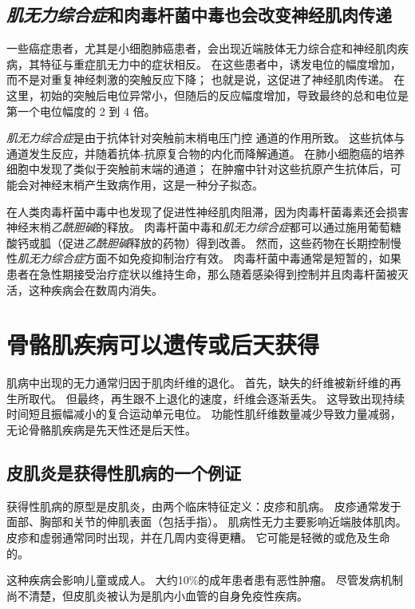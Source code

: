 \subsection{\textit{肌无力综合症}和肉毒杆菌中毒也会改变神经肌肉传递}

一些癌症患者，尤其是小细胞肺癌患者，会出现近端肢体无力综合症和神经肌肉疾病，其特征与重症肌无力中的症状相反。
在这些患者中，诱发电位的幅度增加，而不是对重复神经刺激的突触反应下降；
也就是说，这促进了神经肌肉传递。
在这里，初始的突触后电位异常小，但随后的反应幅度增加，导致最终的总和电位是第一个电位幅度的 2 到 4 倍。


\textit{肌无力综合症}是由于抗体针对突触前末梢电压门控  通道的作用所致。
这些抗体与通道发生反应，并随着抗体-抗原复合物的内化而降解通道。
在肺小细胞癌的培养细胞中发现了类似于突触前末端的通道；
在肿瘤中针对这些抗原产生抗体后，可能会对神经末梢产生致病作用，这是一种分子拟态。


在人类肉毒杆菌中毒中也发现了促进性神经肌肉阻滞，因为肉毒杆菌毒素还会损害神经末梢\textit{乙酰胆碱}的释放。
肉毒杆菌中毒和\textit{肌无力综合症}都可以通过施用葡萄糖酸钙或胍（促进\textit{乙酰胆碱}释放的药物）得到改善。
然而，这些药物在长期控制慢性\textit{肌无力综合症}方面不如免疫抑制治疗有效。
肉毒杆菌中毒通常是短暂的，如果患者在急性期接受治疗症状以维持生命，那么随着感染得到控制并且肉毒杆菌被灭活，这种疾病会在数周内消失。



\section{骨骼肌疾病可以遗传或后天获得}

肌病中出现的无力通常归因于肌肉纤维的退化。
首先，缺失的纤维被新纤维的再生所取代。
但最终，再生跟不上退化的速度，纤维会逐渐丢失。
这导致出现持续时间短且振幅减小的复合运动单元电位。
功能性肌纤维数量减少导致力量减弱，无论骨骼肌疾病是先天性还是后天性。



\subsection{皮肌炎是获得性肌病的一个例证}

获得性肌病的原型是皮肌炎，由两个临床特征定义：皮疹和肌病。
皮疹通常发于面部、胸部和关节的伸肌表面（包括手指）。
肌病性无力主要影响近端肢体肌肉。
皮疹和虚弱通常同时出现，并在几周内变得更糟。
它可能是轻微的或危及生命的。


这种疾病会影响儿童或成人。
大约10\%的成年患者患有恶性肿瘤。
尽管发病机制尚不清楚，但皮肌炎被认为是肌内小血管的自身免疫性疾病。



